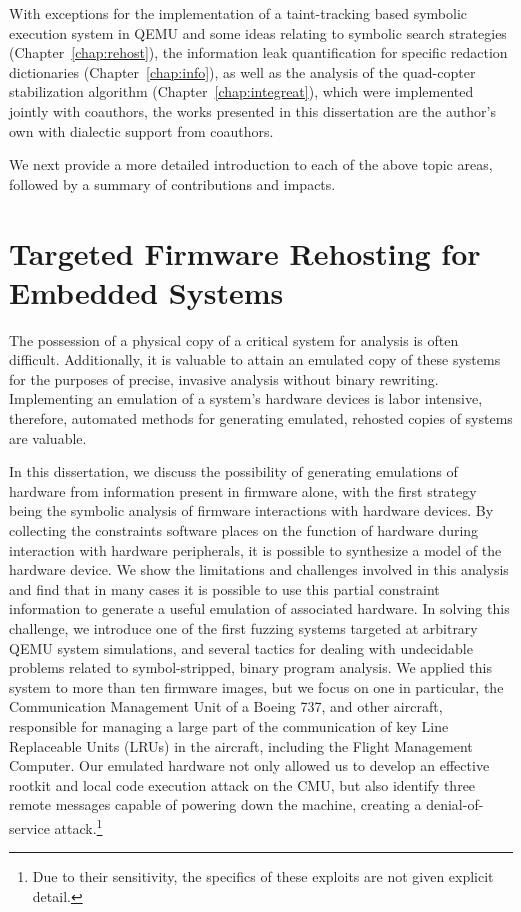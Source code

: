 With exceptions for the implementation of a taint-tracking based symbolic execution system in QEMU and some ideas relating to symbolic search strategies (Chapter~\ref{chap:rehost}), the information leak quantification for specific redaction dictionaries (Chapter~\ref{chap:info}), as well as the analysis of the quad-copter stabilization algorithm (Chapter~\ref{chap:integreat}), which were implemented jointly with coauthors, the works presented in this dissertation are the author's own with dialectic support from coauthors.

We next provide a more detailed introduction to each of the above topic areas, followed by a summary of contributions and impacts.

\section{Targeted Firmware Rehosting for Embedded Systems}

The possession of a physical copy of a critical system for analysis is often difficult.
Additionally, it is valuable to attain an emulated copy of these systems for the purposes of precise, invasive analysis without binary rewriting.
Implementing an emulation of a system's hardware devices is labor intensive, therefore, automated methods for generating emulated, rehosted copies of systems are valuable.

In this dissertation, we discuss the possibility of generating emulations of hardware from information present in firmware alone, with the first strategy being the symbolic analysis of firmware interactions with hardware devices.
By collecting the constraints software places on the function of hardware during interaction with hardware peripherals, it is possible to synthesize a model of the hardware device.
We show the limitations and challenges involved in this analysis and find that in many cases it is possible to use this partial constraint information to generate a useful emulation of associated hardware.
In solving this challenge, we introduce one of the first fuzzing systems targeted at arbitrary QEMU system simulations, and several tactics for dealing with undecidable problems related to symbol-stripped, binary program analysis.
We applied this system to more than ten firmware images, but we focus on one in particular, the Communication Management Unit of a Boeing 737, and other aircraft, responsible for managing a large part of the communication of key Line Replaceable Units (LRUs) in the aircraft, including the Flight Management Computer.
Our emulated hardware not only allowed us to develop an effective rootkit and local code execution attack on the CMU, but also identify three remote messages capable of powering down the machine, creating a denial-of-service attack.\footnote{Due to their sensitivity, the specifics of these exploits are not given explicit detail.}

